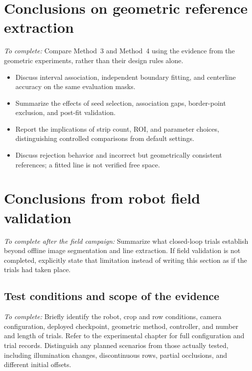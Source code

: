\section{Conclusions on geometric reference extraction}
\label{sec:c6_geometry}

\emph{To complete:} Compare Method~3 and Method~4 using the evidence from
the geometric experiments, rather than their design rules alone.
\begin{itemize}
    \item Discuss interval association, independent boundary fitting,
    and centerline accuracy on the same evaluation masks.
    \item Summarize the effects of seed selection, association gaps,
    border-point exclusion, and post-fit validation.
    \item Report the implications of strip count, ROI, and parameter
    choices, distinguishing controlled comparisons from default settings.
    \item Discuss rejection behavior and incorrect but geometrically
    consistent references; a fitted line is not verified free space.
\end{itemize}

\section{Conclusions from robot field validation}
\label{sec:c6_field_validation}

\emph{To complete after the field campaign:} Summarize what closed-loop
trials establish beyond offline image segmentation and line extraction.
If field validation is not completed, explicitly state that limitation
instead of writing this section as if the trials had taken place.

\subsection{Test conditions and scope of the evidence}
\label{subsec:c6_field_conditions}

\emph{To complete:} Briefly identify the robot, crop and row conditions,
camera configuration, deployed checkpoint, geometric method, controller,
and number and length of trials. Refer to the experimental chapter for
full configuration and trial records. Distinguish any planned scenarios
from those actually tested, including illumination changes, discontinuous
rows, partial occlusions, and different initial offsets.

